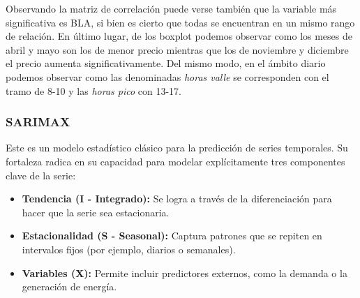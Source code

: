 Observando la matriz de correlación puede verse también que la variable más significativa es BLA, si bien es cierto que todas se encuentran en un mismo rango de relación. En último lugar, de los boxplot podemos observar como los meses de abril y mayo son los de menor precio mientras que los de noviembre y diciembre el precio aumenta significativamente. Del mismo modo, en el ámbito diario podemos observar como las denominadas \textit{horas valle} se corresponden con el tramo de 8-10 y las \textit{horas pico} con 13-17.
%
%
%
\subsubsection{SARIMAX}
%
%
%
Este es un modelo estadístico clásico para la predicción de series temporales. Su fortaleza radica en su capacidad para modelar explícitamente tres componentes clave de la serie:

\begin{itemize}
    \item \textbf{Tendencia (I - Integrado):} Se logra a través de la diferenciación para hacer que la serie sea estacionaria.
    \item \textbf{Estacionalidad (S - Seasonal):} Captura patrones que se repiten en intervalos fijos (por ejemplo, diarios o semanales).
    \item \textbf{Variables (X):} Permite incluir predictores externos, como la demanda o la generación de energía.
\end{itemize}

